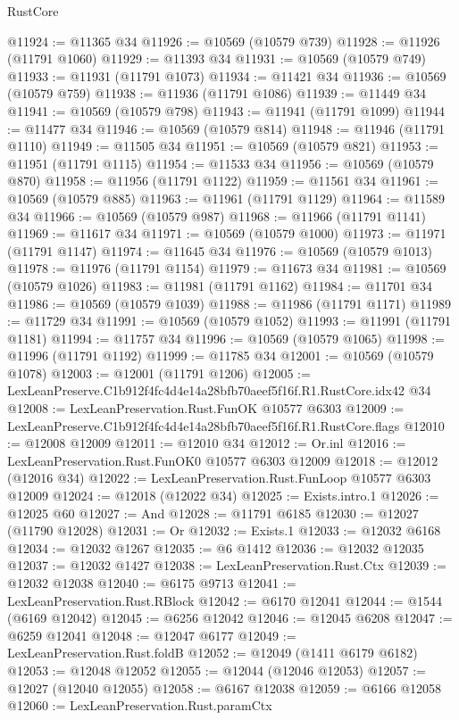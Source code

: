 \begin{lexlean}{RustCore}
\begin{coremodule}
@11924 := @11365 @34
@11926 := @10569 (@10579 @739)
@11928 := @11926 (@11791 @1060)
@11929 := @11393 @34
@11931 := @10569 (@10579 @749)
@11933 := @11931 (@11791 @1073)
@11934 := @11421 @34
@11936 := @10569 (@10579 @759)
@11938 := @11936 (@11791 @1086)
@11939 := @11449 @34
@11941 := @10569 (@10579 @798)
@11943 := @11941 (@11791 @1099)
@11944 := @11477 @34
@11946 := @10569 (@10579 @814)
@11948 := @11946 (@11791 @1110)
@11949 := @11505 @34
@11951 := @10569 (@10579 @821)
@11953 := @11951 (@11791 @1115)
@11954 := @11533 @34
@11956 := @10569 (@10579 @870)
@11958 := @11956 (@11791 @1122)
@11959 := @11561 @34
@11961 := @10569 (@10579 @885)
@11963 := @11961 (@11791 @1129)
@11964 := @11589 @34
@11966 := @10569 (@10579 @987)
@11968 := @11966 (@11791 @1141)
@11969 := @11617 @34
@11971 := @10569 (@10579 @1000)
@11973 := @11971 (@11791 @1147)
@11974 := @11645 @34
@11976 := @10569 (@10579 @1013)
@11978 := @11976 (@11791 @1154)
@11979 := @11673 @34
@11981 := @10569 (@10579 @1026)
@11983 := @11981 (@11791 @1162)
@11984 := @11701 @34
@11986 := @10569 (@10579 @1039)
@11988 := @11986 (@11791 @1171)
@11989 := @11729 @34
@11991 := @10569 (@10579 @1052)
@11993 := @11991 (@11791 @1181)
@11994 := @11757 @34
@11996 := @10569 (@10579 @1065)
@11998 := @11996 (@11791 @1192)
@11999 := @11785 @34
@12001 := @10569 (@10579 @1078)
@12003 := @12001 (@11791 @1206)
@12005 := LexLeanPreserve.C1b912f4fc4d4e14a28bfb70aeef5f16f.R1.RustCore.idx42 @34
@12008 := LexLeanPreservation.Rust.FunOK @10577 @6303
@12009 := LexLeanPreserve.C1b912f4fc4d4e14a28bfb70aeef5f16f.R1.RustCore.flags
@12010 := @12008 @12009
@12011 := @12010 @34
@12012 := Or.inl
@12016 := LexLeanPreservation.Rust.FunOK0 @10577 @6303 @12009
@12018 := @12012 (@12016 @34)
@12022 := LexLeanPreservation.Rust.FunLoop @10577 @6303 @12009
@12024 := @12018 (@12022 @34)
@12025 := Exists.intro.{1}
@12026 := @12025 @60
@12027 := And
@12028 := @11791 @6185
@12030 := @12027 (@11790 @12028)
@12031 := Or
@12032 := Exists.{1}
@12033 := @12032 @6168
@12034 := @12032 @1267
@12035 := @6 @1412
@12036 := @12032 @12035
@12037 := @12032 @1427
@12038 := LexLeanPreservation.Rust.Ctx
@12039 := @12032 @12038
@12040 := @6175 @9713
@12041 := LexLeanPreservation.Rust.RBlock
@12042 := @6170 @12041
@12044 := @1544 (@6169 @12042)
@12045 := @6256 @12042
@12046 := @12045 @6208
@12047 := @6259 @12041
@12048 := @12047 @6177
@12049 := LexLeanPreservation.Rust.foldB
@12052 := @12049 (@1411 @6179 @6182)
@12053 := @12048 @12052
@12055 := @12044 (@12046 @12053)
@12057 := @12027 (@12040 @12055)
@12058 := @6167 @12038
@12059 := @6166 @12058
@12060 := LexLeanPreservation.Rust.paramCtx

\end{coremodule}
\end{lexlean}
